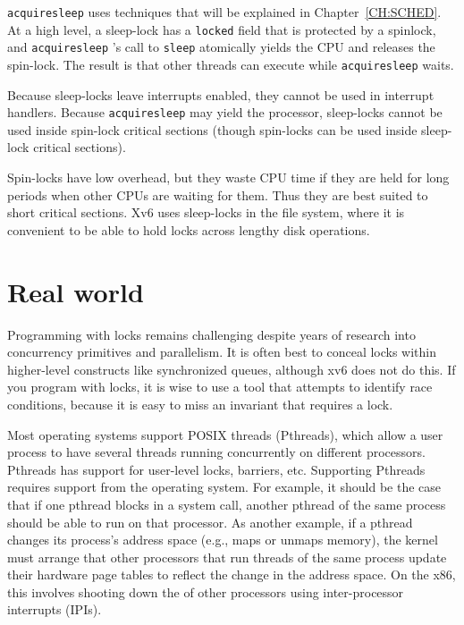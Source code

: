 \lstinline{acquiresleep}
uses techniques that will be explained in
Chapter~\ref{CH:SCHED}.
At a high level, a sleep-lock has a
\lstinline{locked}
field that is protected by a spinlock, and 
\lstinline{acquiresleep} 's
call to
\lstinline{sleep}
atomically yields the CPU and releases the spin-lock.
The result is that other threads can execute while
\lstinline{acquiresleep}
waits.

Because sleep-locks leave interrupts enabled, they cannot be
used in interrupt handlers.
Because
\lstinline{acquiresleep}
may yield the processor,
sleep-locks cannot be used inside spin-lock critical
sections (though spin-locks can be used inside sleep-lock
critical sections).

Spin-locks have low overhead, but they waste CPU time if they
are held for long periods when other CPUs are waiting
for them.
Thus they are best suited to short critical sections.
Xv6 uses sleep-locks in the file system,
where it is convenient to
be able to hold locks across lengthy disk operations.
\section{Real world}
Programming with locks remains challenging despite years of research
into concurrency primitives and parallelism.
It is often best to conceal locks within 
higher-level constructs like synchronized queues, although xv6 does not
do this.  If you program with locks, it is wise to use a tool that attempts to
identify race conditions, because it is easy to miss an invariant that requires
a lock.

Most operating systems support POSIX threads (Pthreads), which allow a user
process to have several threads running concurrently on different processors.
Pthreads has support for user-level locks, barriers, etc.  Supporting Pthreads requires
support from the operating system. For example, it should be the case that if
one pthread blocks in a system call, another pthread of the same process should
be able to run on that processor.  As another example, if a pthread changes its
process's address space (e.g., maps or unmaps memory), the kernel must arrange that
other processors that run threads of the same process update their hardware page
tables to reflect the change in the address space.  On the x86, this involves
shooting down the
of other processors using inter-processor interrupts (IPIs).

